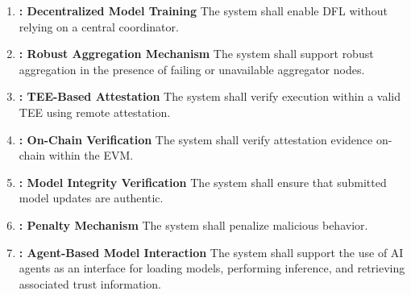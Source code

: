 \begin{enumerate}
    \item \label{req:F1} \textbf{\thefuncReq: Decentralized Model Training}  
    The system shall enable \ac{DFL} without relying on a central coordinator.

    \item \label{req:F2} \textbf{\thefuncReq: Robust Aggregation Mechanism}  
    The system shall support robust aggregation in the presence of failing or unavailable aggregator nodes.

    \item \label{req:F3} \textbf{\thefuncReq: TEE-Based Attestation}  
    The system shall verify execution within a valid \ac{TEE} using remote attestation.

    \item \label{req:F4} \textbf{\thefuncReq: On-Chain Verification}  
    The system shall verify attestation evidence on-chain within the \ac{EVM}.

    \item \label{req:F5} \textbf{\thefuncReq: Model Integrity Verification}  
    The system shall ensure that submitted model updates are authentic.




    \item \label{req:F6} \textbf{\thefuncReq: Penalty Mechanism}  
    The system shall penalize malicious behavior.

    \item \label{req:F13} \textbf{\thefuncReq: Agent-Based Model Interaction}  
    The system shall support the use of AI agents as an interface for loading models, performing inference, and retrieving associated trust information.

\end{enumerate}

